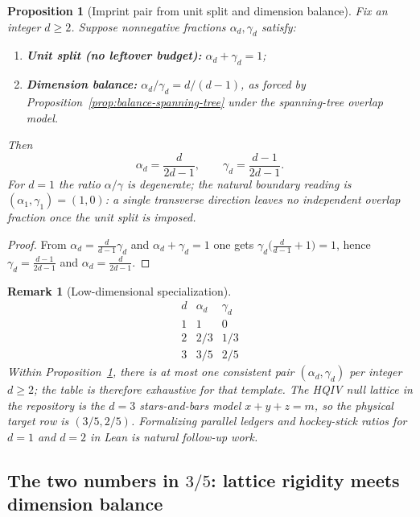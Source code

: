 \documentclass[11pt]{amsart}
\newtheorem{proposition}[theorem]{Proposition}
\newtheorem{remark}[theorem]{Remark}
\begin{document}
\begin{proposition}[Imprint pair from unit split and dimension balance]
\label{prop:dim-split-family}
Fix an integer \(d\ge 2\). Suppose nonnegative fractions \(\alpha_d,\gamma_d\) satisfy:
\begin{enumerate}
  \item \textbf{Unit split (no leftover budget):} \(\alpha_d+\gamma_d=1\);
  \item \textbf{Dimension balance:} \(\alpha_d/\gamma_d = d/(d-1)\), as forced by Proposition~\ref{prop:balance-spanning-tree} under the spanning-tree overlap model.
\end{enumerate}
Then
\[
\alpha_d=\frac{d}{2d-1},\qquad \gamma_d=\frac{d-1}{2d-1}.
\]
For \(d=1\) the ratio \(\alpha/\gamma\) is degenerate; the natural boundary reading is \((\alpha_1,\gamma_1)=(1,0)\): a single transverse direction leaves no independent overlap fraction once the unit split is imposed.
\end{proposition}

\begin{proof}
From \(\alpha_d = \frac{d}{d-1}\gamma_d\) and \(\alpha_d+\gamma_d=1\) one gets \(\gamma_d\bigl(\frac{d}{d-1}+1\bigr)=1\), hence \(\gamma_d=\frac{d-1}{2d-1}\) and \(\alpha_d=\frac{d}{2d-1}\).
\end{proof}

\begin{remark}[Low-dimensional specialization]
\label{rem:dim-table}
\[
\begin{array}{c|cc}
d & \alpha_d & \gamma_d\\\hline
1 & 1 & 0\\
2 & 2/3 & 1/3\\
3 & 3/5 & 2/5
\end{array}
\]
Within Proposition~\ref{prop:dim-split-family}, there is at most one consistent pair \((\alpha_d,\gamma_d)\) per integer \(d\ge 2\); the table is therefore exhaustive for that template. The HQIV null lattice in the repository is the \(d=3\) stars-and-bars model \(x+y+z=m\), so the physical target row is \((3/5,2/5)\). Formalizing parallel ledgers and hockey-stick ratios for \(d=1\) and \(d=2\) in Lean is natural follow-up work.
\end{remark}

\subsection{The two numbers in \texorpdfstring{$3/5$}{3/5}: lattice rigidity meets dimension balance}
\label{subsec:alpha-three-fifths}
\end{document}
